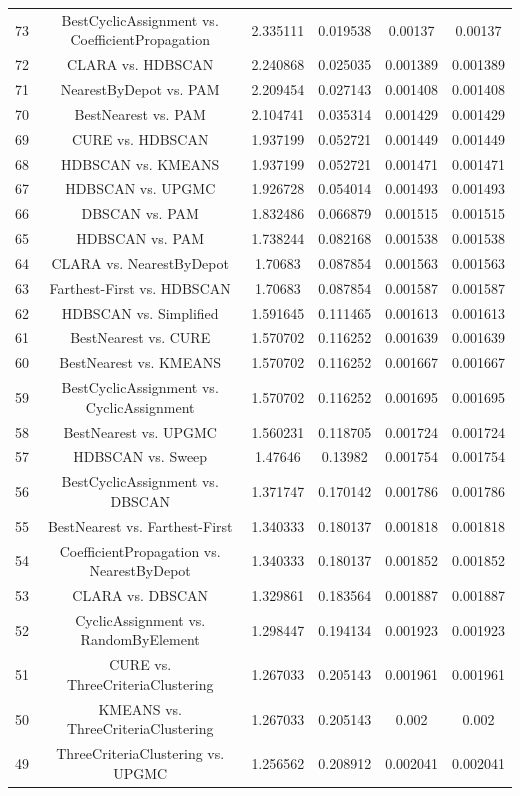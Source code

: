 \documentclass[a4paper,10pt]{article}
\begin{document}
\begin{landscape}
\begin{table}[!htp]
\begin{tabular}{cccccc}
73&BestCyclicAssignment vs. CoefficientPropagation&2.335111&0.019538&0.00137&0.00137\\
72&CLARA vs. HDBSCAN&2.240868&0.025035&0.001389&0.001389\\
71&NearestByDepot vs. PAM&2.209454&0.027143&0.001408&0.001408\\
70&BestNearest vs. PAM&2.104741&0.035314&0.001429&0.001429\\
69&CURE vs. HDBSCAN&1.937199&0.052721&0.001449&0.001449\\
68&HDBSCAN vs. KMEANS&1.937199&0.052721&0.001471&0.001471\\
67&HDBSCAN vs. UPGMC&1.926728&0.054014&0.001493&0.001493\\
66&DBSCAN vs. PAM&1.832486&0.066879&0.001515&0.001515\\
65&HDBSCAN vs. PAM&1.738244&0.082168&0.001538&0.001538\\
64&CLARA vs. NearestByDepot&1.70683&0.087854&0.001563&0.001563\\
63&Farthest-First vs. HDBSCAN&1.70683&0.087854&0.001587&0.001587\\
62&HDBSCAN vs. Simplified&1.591645&0.111465&0.001613&0.001613\\
61&BestNearest vs. CURE&1.570702&0.116252&0.001639&0.001639\\
60&BestNearest vs. KMEANS&1.570702&0.116252&0.001667&0.001667\\
59&BestCyclicAssignment vs. CyclicAssignment&1.570702&0.116252&0.001695&0.001695\\
58&BestNearest vs. UPGMC&1.560231&0.118705&0.001724&0.001724\\
57&HDBSCAN vs. Sweep&1.47646&0.13982&0.001754&0.001754\\
56&BestCyclicAssignment vs. DBSCAN&1.371747&0.170142&0.001786&0.001786\\
55&BestNearest vs. Farthest-First&1.340333&0.180137&0.001818&0.001818\\
54&CoefficientPropagation vs. NearestByDepot&1.340333&0.180137&0.001852&0.001852\\
53&CLARA vs. DBSCAN&1.329861&0.183564&0.001887&0.001887\\
52&CyclicAssignment vs. RandomByElement&1.298447&0.194134&0.001923&0.001923\\
51&CURE vs. ThreeCriteriaClustering&1.267033&0.205143&0.001961&0.001961\\
50&KMEANS vs. ThreeCriteriaClustering&1.267033&0.205143&0.002&0.002\\
49&ThreeCriteriaClustering vs. UPGMC&1.256562&0.208912&0.002041&0.002041\\

\end{tabular}
\end{table}
\end{landscape}
\end{document}
